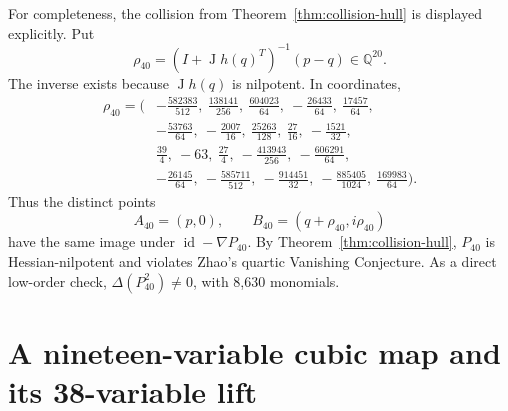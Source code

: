 \documentclass[11pt]{article}
\theoremstyle{remark}
\DeclareMathOperator{\J}{J}
\newcommand{\Q}{\mathbb{Q}}
\newcommand{\id}{\operatorname{id}}
\begin{document}
For completeness, the collision from Theorem~\ref{thm:collision-hull} is displayed explicitly. Put
\begin{equation}\label{eq:rho40-def}
\rho_{40}=(I+\J h(q)^T)^{-1}(p-q)\in\Q^{20}.
\end{equation}
The inverse exists because $\J h(q)$ is nilpotent. In coordinates,
\[
\begin{split}
\rho_{40}=(&-\tfrac{582383}{512},\ \tfrac{138141}{256},\ \tfrac{604023}{64},\ -\tfrac{26433}{64},\ \tfrac{17457}{64},\\
&-\tfrac{53763}{64},\ -\tfrac{2007}{16},\ \tfrac{25263}{128},\ \tfrac{27}{16},\ -\tfrac{1521}{32},\\
&\tfrac{39}{4},\ -63,\ \tfrac{27}{4},\ -\tfrac{413943}{256},\ -\tfrac{606291}{64},\\
&-\tfrac{26145}{64},\ -\tfrac{585711}{512},\ -\tfrac{914451}{32},\ -\tfrac{885405}{1024},\ \tfrac{169983}{64}).
\end{split}
\]
Thus the distinct points
\begin{equation}\label{eq:collision40}
A_{40}=(p,0),\qquad B_{40}=(q+\rho_{40},i\rho_{40})
\end{equation}
have the same image under $\id-\nabla P_{40}$. By Theorem~\ref{thm:collision-hull}, $P_{40}$ is Hessian-nilpotent and violates Zhao's quartic Vanishing Conjecture. As a direct low-order check, $\Delta(P_{40}^2)\ne0$, with 8,630 monomials.

\section{A nineteen-variable cubic map and its 38-variable lift}\label{sec:thirtyeight}
\end{document}
